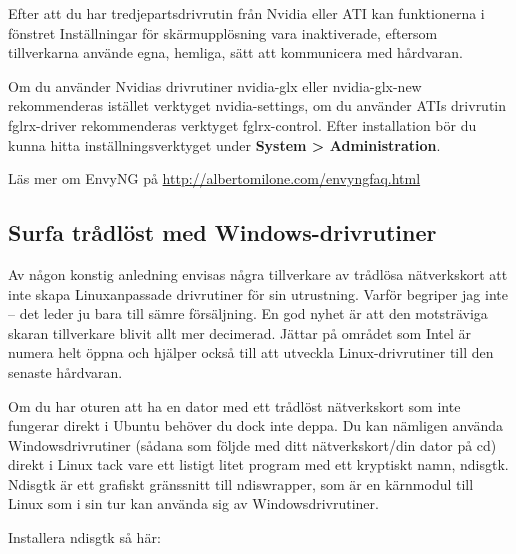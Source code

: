 \documentclass[a4paper,final]{memoir} %
\begin{document}
Efter att du har tredjepartsdrivrutin från Nvidia eller ATI kan funktionerna i fönstret Inställningar för skärmupplösning vara inaktiverade, eftersom tillverkarna använde egna, hemliga, sätt att kommunicera med hårdvaran. 

Om du använder Nvidias drivrutiner nvidia-glx eller nvidia-glx-new rekommenderas istället verktyget nvidia-settings, om du använder ATIs drivrutin fglrx-driver rekommenderas verktyget fglrx-control. Efter installation bör du kunna hitta inställningsverktyget under \textbf{System \textgreater{} Administration}.

Läs mer om EnvyNG på \url{http://albertomilone.com/envyngfaq.html}


\subsection{Surfa trådlöst med Windows-drivrutiner}


Av någon konstig anledning envisas några tillverkare av trådlösa nätverkskort att inte skapa Linuxanpassade drivrutiner för sin utrustning. Varför begriper jag inte -- det leder ju bara till sämre försäljning. En god nyhet är att den motsträviga skaran tillverkare blivit allt mer decimerad. Jättar på området som Intel är numera helt öppna och hjälper också till att utveckla Linux-drivrutiner till den senaste hårdvaran.

Om du har oturen att ha en dator med ett trådlöst nätverkskort som inte fungerar direkt i Ubuntu behöver du dock inte deppa. Du kan nämligen använda Windowsdrivrutiner (sådana som följde med ditt nätverkskort/din dator på cd) direkt i Linux tack vare ett listigt litet program med ett kryptiskt namn, ndisgtk. Ndisgtk är ett grafiskt gränssnitt till ndiswrapper, som är en kärnmodul till Linux som i sin tur kan använda sig av Windowsdrivrutiner.


Installera ndisgtk så här:
\end{document}
